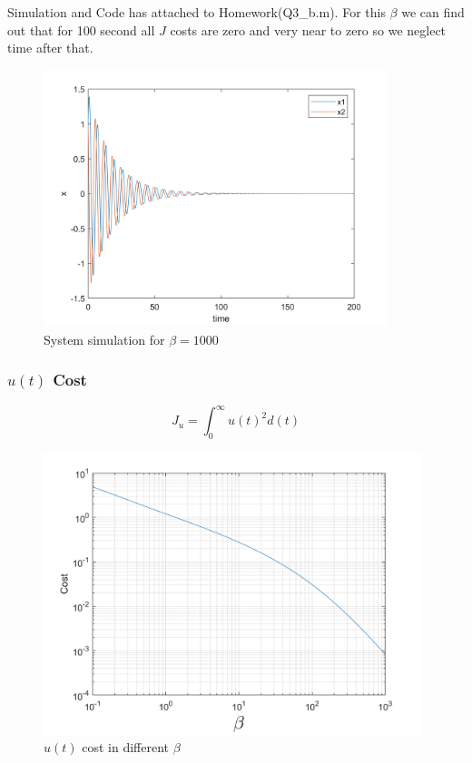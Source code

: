 Simulation and Code has attached to Homework(Q3\_b.m). For this $\beta$ we can find out that for 100 second all $J$ costs are zero and very near to zero so we neglect time after that.
\begin{figure}[H]
	\caption{System simulation for $\beta = 1000$}
	\centering
	\includegraphics[width=10cm]{../Code/Q3/figures/FinalBeta.png}
\end{figure}
\subsubsection{$u(t)$ Cost}
$$J_u = \int_{0}^{\infty} u(t)^2d(t)$$
\begin{figure}[H]
	\caption{$u(t)$ cost in different $\beta$}
	\centering
	\includegraphics[width=11cm]{../Code/Q3/figures/uCost.png}
\end{figure}
